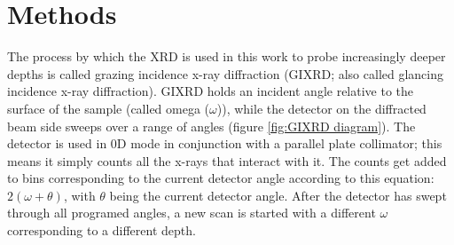 \chapter{Methods}


    The process by which the XRD is used in this work to probe increasingly deeper depths is called grazing incidence x-ray diffraction\cite{pandey_structural_2021} (GIXRD; also called glancing incidence x-ray diffraction\cite{COLOMBI2007554}).
    GIXRD holds an incident angle relative to the surface of the sample (called omega ($\omega$)), while the detector on the diffracted beam side sweeps over a range of angles (figure \ref{fig:GIXRD diagram}).
    The detector is used in 0D mode in conjunction with a parallel plate collimator; this means it simply counts all the x-rays that interact with it.
    The counts get added to bins corresponding to the current detector angle according to this equation: $2(\omega+\theta)$, with $\theta$ being the current detector angle.
    After the detector has swept through all programed angles, a new scan is started with a different $\omega$ corresponding to a different depth.

